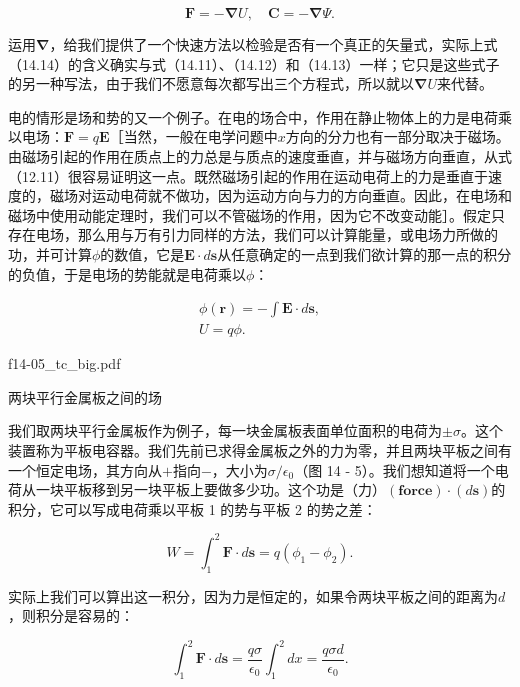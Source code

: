 \documentclass[12pt,oneside]{book}
\providecommand{\FLPvec}[1]{\boldsymbol{#1}}
\providecommand{\FLPC}[0]{\FLPvec{C}}
\providecommand{\FLPE}[0]{\FLPvec{E}}
\providecommand{\FLPF}[0]{\FLPvec{F}}
\providecommand{\FLPr}[0]{\FLPvec{r}}
\providecommand{\FLPs}[0]{\FLPvec{s}}
\providecommand{\FLPnabla}[0]{\boldsymbol{\nabla}}
\providecommand{\FLPgrad}[1]{\FLPnabla{#1}}
\begin{document}
\begin{equation}
\label{Eq:I:14:14}
\FLPF=-\FLPgrad{U},\quad
\FLPC=-\FLPgrad{\Psi}.
\end{equation}

运用$\FLPnabla$，给我们提供了一个快速方法以检验是否有一个真正的矢量式，实际上式（14.14）的含义确实与式（14.11）、（14.12）和（14.13）一样；它只是这些式子的另一种写法，由于我们不愿意每次都写出三个方程式，所以就以$\FLPgrad{U}$来代替。


电的情形是场和势的又一个例子。在电的场合中，作用在静止物体上的力是电荷乘以电场：$\FLPF = q\FLPE$［当然，一般在电学问题中$x$方向的分力也有一部分取决于磁场。由磁场引起的作用在质点上的力总是与质点的速度垂直，并与磁场方向垂直，从式（12.11）很容易证明这一点。既然磁场引起的作用在运动电荷上的力是垂直于速度的，磁场对运动电荷就不做功，因为运动方向与力的方向垂直。因此，在电场和磁场中使用动能定理时，我们可以不管磁场的作用，因为它不改变动能］。假定只存在电场，那么用与万有引力同样的方法，我们可以计算能量，或电场力所做的功，并可计算$\phi$的数值，它是$\FLPE\cdot d\FLPs$从任意确定的一点到我们欲计算的那一点的积分的负值，于是电场的势能就是电荷乘以$\phi$：

\begin{gather*}
\phi(\FLPr)=-\int\FLPE\cdot d\FLPs,\\[1ex]
U=q\phi.
\end{gather*}


\begin{fig}{f14-05_tc_big.pdf}
\caption{两块平行金属板之间的场}
\label{fig:14-5}
\end{fig}

我们取两块平行金属板作为例子，每一块金属板表面单位面积的电荷为$\pm \sigma$。这个装置称为平板电容器。我们先前已求得金属板之外的力为零，并且两块平板之间有一个恒定电场，其方向从$+$指向$-$，大小为$\sigma/\epsilon_0$（图 14 - 5）。我们想知道将一个电荷从一块平板移到另一块平板上要做多少功。这个功是（力）$(\textbf{force})\cdot(d\FLPs)$的积分，它可以写成电荷乘以平板 1 的势与平板 2 的势之差：


\begin{equation*}
W=\int_1^2\FLPF\cdot d\FLPs=q(\phi_1-\phi_2).
\end{equation*}

实际上我们可以算出这一积分，因为力是恒定的，如果令两块平板之间的距离为$d$，则积分是容易的：


\begin{equation*}
\int_1^2\FLPF\cdot d\FLPs=\frac{q\sigma}{\epsilon_0}\int_1^2dx=
\frac{q\sigma d}{\epsilon_0}.
\end{equation*}
\end{document}
